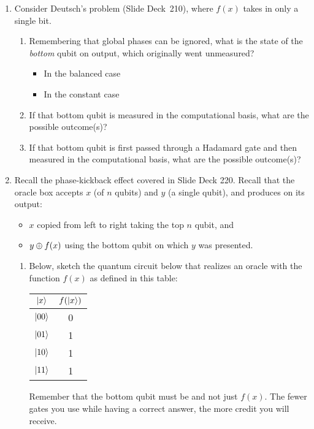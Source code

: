 \documentclass[12pt]{article}
\begin{document}
\begin{enumerate}[font=\bfseries]
    \item{} Consider Deutsch's problem (Slide Deck~210), where $f(x)$ takes in only a single bit.
    \begin{enumerate}[label=\theenumi.\arabic*]
        \item Remembering that global phases can be ignored, what is the state of the \emph{bottom} qubit on output, which originally went unmeasured?
        \begin{itemize}
            \item In the balanced case  \Ans{$\ket{-}$}
            \item In the constant case
            \Ans{$\ket{-}$}
        \end{itemize}
        \item If that bottom qubit is measured in the computational basis, what are the possible outcome(s)? 
        \item If that bottom qubit is first passed through a Hadamard gate and then measured in the computational basis, what are the possible outcome(s)? 
    \end{enumerate}
    \item{} Recall the phase-kickback effect covered in Slide Deck 220.  Recall that the oracle box accepts $x$ (of $n$ qubits) and $y$ (a single qubit), and produces on its output:
    \begin{itemize}
        \item $x$ copied from left to right taking the top $n$ qubit, and
        \item $y\oplus f(x)$ using the bottom qubit on which $y$ was presented.
    \end{itemize}
    \begin{enumerate}[label=\theenumi.\arabic*]
        \item Below, sketch the quantum circuit below that realizes an oracle with the function $f(x)$ as defined in this table:
        \begin{center}
            \begin{tabular}{c|c}
                 $\ket{x}$&$f(\ket{x})$  \\\hline
                 $\ket{00}$ & 0 \\
                 $\ket{01}$ & 1 \\
                 $\ket{10}$ & 1 \\
                 $\ket{11}$ & 1 \\
            \end{tabular}
        \end{center}
        Remember that the bottom qubit must be  and not just $f(x)$.
        The fewer gates you use while having a correct answer, the more credit you will receive.
        

\end{enumerate}
\end{enumerate}
\end{document}
